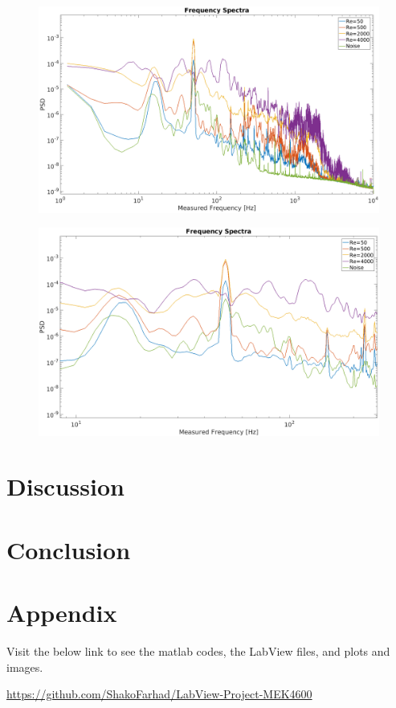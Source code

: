 \documentclass[english,a4paper,12pt]{article}
\begin{document}
\begin{figure}[H]
    \centering
    \includegraphics[width=180mm]{FrequencySpectraPlot.png}
    \caption{}
    \label{fig:3}
\end{figure}

\begin{figure}[H]
    \centering
    \includegraphics[width=180mm]{FrequencySpectraPlotZoomed.png}
    \caption{}
    \label{fig:4}
\end{figure}

\section*{Discussion}


\section*{Conclusion}


\section*{Appendix}
Visit the below link to see the matlab codes, the LabView files, and plots and images.

\url{https://github.com/ShakoFarhad/LabView-Project-MEK4600}


 \bigskip \bigskip
\end{document}
